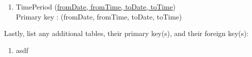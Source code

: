 \documentclass{article}
\begin{document}
\begin{enumerate}
		\item TimePeriod (\underline{fromDate, fromTime, toDate, toTime}) \\
			Primary key : (fromDate, fromTime, toDate, toTime)
	\end{enumerate}
	Lastly, list any additional tables, their primary key(s), and their foreign key(s):
	\begin{enumerate}
		\item asdf
	\end{enumerate}
	
\end{document}
